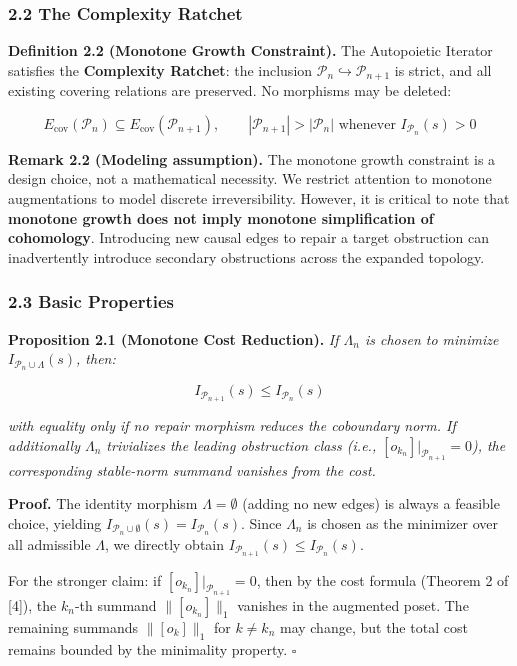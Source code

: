 \documentclass[
]{article}
\begin{document}
\subsubsection{2.2 The Complexity Ratchet}\label{the-complexity-ratchet}

\textbf{Definition 2.2 (Monotone Growth Constraint).} The Autopoietic
Iterator satisfies the \textbf{Complexity Ratchet}: the inclusion
\(\mathcal{P}_n \hookrightarrow \mathcal{P}_{n+1}\) is strict, and all
existing covering relations are preserved. No morphisms may be deleted:

\[E_{\text{cov}}(\mathcal{P}_n) \subseteq E_{\text{cov}}(\mathcal{P}_{n+1}), \qquad |\mathcal{P}_{n+1}| > |\mathcal{P}_n| \text{ whenever } I_{\mathcal{P}_n}(s) > 0\]

\textbf{Remark 2.2 (Modeling assumption).} The monotone growth
constraint is a design choice, not a mathematical necessity. We restrict
attention to monotone augmentations to model discrete irreversibility.
However, it is critical to note that \textbf{monotone growth does not
imply monotone simplification of cohomology}. Introducing new causal
edges to repair a target obstruction can inadvertently introduce
secondary obstructions across the expanded topology.

\subsubsection{2.3 Basic Properties}\label{basic-properties}

\textbf{Proposition 2.1 (Monotone Cost Reduction).} \emph{If
\(\Lambda_n\) is chosen to minimize
\(I_{\mathcal{P}_n \cup \Lambda}(s)\), then:}

\[I_{\mathcal{P}_{n+1}}(s) \leq I_{\mathcal{P}_n}(s)\]

\emph{with equality only if no repair morphism reduces the coboundary
norm. If additionally \(\Lambda_n\) trivializes the leading obstruction
class (i.e., \([o_{k_n}]|_{\mathcal{P}_{n+1}} = 0\)), the corresponding
stable-norm summand vanishes from the cost.}

\textbf{Proof.} The identity morphism \(\Lambda = \emptyset\) (adding no
new edges) is always a feasible choice, yielding
\(I_{\mathcal{P}_n \cup \emptyset}(s) = I_{\mathcal{P}_n}(s)\). Since
\(\Lambda_n\) is chosen as the minimizer over all admissible
\(\Lambda\), we directly obtain
\(I_{\mathcal{P}_{n+1}}(s) \leq I_{\mathcal{P}_n}(s)\).

For the stronger claim: if \([o_{k_n}]|_{\mathcal{P}_{n+1}} = 0\), then
by the cost formula (Theorem 2 of {[}4{]}), the \(k_n\)-th summand
\(\|[o_{k_n}]\|_1\) vanishes in the augmented poset. The remaining
summands \(\|[o_k]\|_1\) for \(k \neq k_n\) may change, but the total
cost remains bounded by the minimality property. \(\square\)
\end{document}

